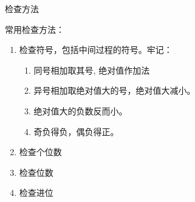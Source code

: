 \documentclass[aspectratio=169]{ctexbeamer} %
\date{\today}
\begin{document}
\begin{frame}[t]{检查方法}
\begin{spacing}{1.2}
\normalsize
\alert{常用检查方法：}
\begin{enumerate}[label={\arabic*.}]
\item 检查符号，包括中间过程的符号。牢记：
	\begin{enumerate}[label={\alph*.}]
	\item 同号相加取其号, 绝对值作加法
	\item 异号相加取绝对值大的号，绝对值大减小。
	\item 绝对值大的负数反而小。
	\item 奇负得负，偶负得正。
	\end{enumerate}
\item 检查个位数
\item 检查位数
\item 检查进位

\end{enumerate}

\end{spacing}
\end{frame}
\end{document}
